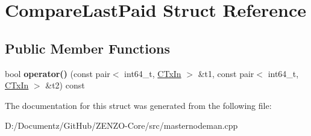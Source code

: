 \hypertarget{struct_compare_last_paid}{}\section{Compare\+Last\+Paid Struct Reference}
\label{struct_compare_last_paid}
\subsection*{Public Member Functions}
\begin{DoxyCompactItemize}
\item 
\mbox{\label{struct_compare_last_paid_aa24cafa94faa955ceebd8791379370f1}} 
bool {\bfseries operator()} (const pair$<$ int64\+\_\+t, \mbox{\hyperlink{class_c_tx_in}{C\+Tx\+In}} $>$ \&t1, const pair$<$ int64\+\_\+t, \mbox{\hyperlink{class_c_tx_in}{C\+Tx\+In}} $>$ \&t2) const
\end{DoxyCompactItemize}


The documentation for this struct was generated from the following file\+:\begin{DoxyCompactItemize}
\item 
D\+:/\+Documentz/\+Git\+Hub/\+Z\+E\+N\+Z\+O-\/\+Core/src/masternodeman.\+cpp\end{DoxyCompactItemize}
